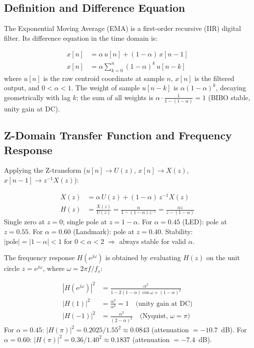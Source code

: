 \subsection{Definition and Difference Equation}

The Exponential Moving Average (EMA) is a first-order recursive (IIR) digital filter. Its difference equation in the time domain is:

\begin{eqblock}
\begin{align}
x[n] &= \alpha\, u[n] + (1-\alpha)\, x[n-1] \\
x[n] &= \alpha \sum_{k=0}^{n} (1-\alpha)^k\, u[n-k]
\end{align}
where $u[n]$ is the raw centroid coordinate at sample $n$, $x[n]$ is the filtered output, and $0<\alpha<1$. The weight of sample $u[n-k]$ is $\alpha(1-\alpha)^k$, decaying geometrically with lag $k$; the sum of all weights is $\alpha \cdot \frac{1}{1-(1-\alpha)} = 1$ (BIBO stable, unity gain at DC).
\end{eqblock}

\subsection{Z-Domain Transfer Function and Frequency Response}

Applying the Z-transform ($u[n]\to U(z)$, $x[n]\to X(z)$, $x[n-1]\to z^{-1}X(z)$):

\begin{eqblock}
\begin{align}
X(z) &= \alpha\, U(z) + (1-\alpha)\, z^{-1} X(z) \\
H(z) &= \frac{X(z)}{U(z)} = \frac{\alpha}{1-(1-\alpha)z^{-1}} = \frac{\alpha z}{z - (1-\alpha)}
\end{align}
Single zero at $z=0$; single pole at $z=1-\alpha$. For $\alpha=0.45$ (LED): pole at $z=0.55$. For $\alpha=0.60$ (Landmark): pole at $z=0.40$. Stability: $|\text{pole}| = |1-\alpha| < 1$ for $0<\alpha<2$ $\Rightarrow$ always stable for valid $\alpha$.
\end{eqblock}

The frequency response $H(e^{j\omega})$ is obtained by evaluating $H(z)$ on the unit circle $z=e^{j\omega}$, where $\omega = 2\pi f/f_s$:

\begin{eqblock}
\begin{align}
|H(e^{j\omega})|^2 &= \frac{\alpha^2}{1-2(1-\alpha)\cos\omega + (1-\alpha)^2} \\
|H(1)|^2 &= \frac{\alpha^2}{\alpha^2} = 1 \quad \text{(unity gain at DC)} \\
|H(-1)|^2 &= \frac{\alpha^2}{(2-\alpha)^2} \quad \text{(Nyquist, } \omega=\pi\text{)}
\end{align}
For $\alpha=0.45$: $|H(\pi)|^2 = 0.2025/1.55^2 \approx 0.0843$ (attenuation $=-10.7$~dB). For $\alpha=0.60$: $|H(\pi)|^2 = 0.36/1.40^2 \approx 0.1837$ (attenuation $=-7.4$~dB).
\end{eqblock}

